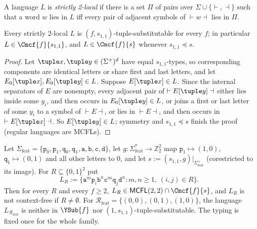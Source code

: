 A language $L$ is \emph{strictly 2-local} if there is a set $\Pi$ of pairs over
$\Sigma\cup\{\vdash,\dashv\}$ such that a word $w$ lies in $L$ iff every pair of
adjacent symbols of $\vdash w\dashv$ lies in $\Pi$.

\begin{lemma}
\label{lem:sl2-boundary-control}
Every strictly 2-local $L$ is $(f,s_{1,1})$-tuple-substitutable for every $f$; in
particular $L\in\Cmcf{f}{s_{1,1}}$, and $L\in\Cmcf{f}{s}$ whenever $s_{1,1}\preceq s$.
\end{lemma}

\begin{proof}
Let $\tuple x,\tuple y\in(\Sigma^+)^d$ have equal $s_{1,1}$-types, so
corresponding components are identical letters or share first and last letters,
and let $E_0[\tuple x],E_0[\tuple y]\in L$.  Suppose $E[\tuple x]\in L$.  Since the
internal separators of $E$ are nonempty, every adjacent pair of
$\vdash E[\tuple y]\dashv$ either lies inside some $y_i$, and then occurs in
$E_0[\tuple y]\in L$, or joins a first or last letter of some $y_i$ to a symbol of
$\vdash E\dashv$, or lies in $\vdash E\dashv$, and then occurs in
$\vdash E[\tuple x]\dashv$.  So $E[\tuple y]\in L$; symmetry and $s_{1,1}\preceq s$
finish the proof (regular languages are MCFLs).
\end{proof}

\begin{proposition}
\label{prop:feature-cross-typed}
Let $\Sigma_{\mathrm{feat}}=\{\mathtt p_0,\mathtt p_1,\mathtt q_0,\mathtt q_1,
\mathtt a,\mathtt b,\mathtt c,\mathtt d\}$, let $g:\Sigma_{\mathrm{feat}}^*\to\mathbb Z_2^2$
map $\mathtt p_1\mapsto(1,0)$, $\mathtt q_1\mapsto(0,1)$ and all other letters to $0$, and
let $s:=(s_{1,1},g)|_{\Sigma_{\mathrm{feat}}^+}$ (corestricted to its image).  For
$R\subseteq\{0,1\}^2$ put
\[
 L_R:=\{\mathtt a^m\mathtt p_i\mathtt b^n\mathtt c^m\mathtt q_j\mathtt d^n:
 m,n\ge1,\ (i,j)\in R\}.
\]
Then for every $R$ and every $f\ge2$, $L_R\in\mathsf{MCFL}(2,2)\cap\Cmcf{f}{s}$, and
$L_R$ is not context-free if $R\ne\emptyset$.  For
$\mathcal R_{\mathrm{feat}}=\{(0,0),(0,1),(1,0)\}$, the language
$L_{\mathcal R_{\mathrm{feat}}}$ is neither in $\YSub{f}$ nor
$(1,s_{1,1})$-tuple-substitutable.  The typing is fixed once for the whole
family.
\end{proposition}


